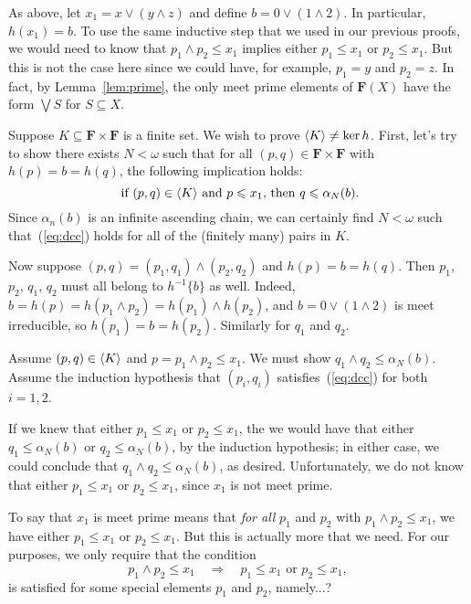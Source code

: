 As above, let $x_1 = x \vee (y \wedge z)$ and define $b = 0\vee (1 \wedge 2)$.  
In particular, $h(x_1) = b$. 
To use the same inductive step that we used in our previous proofs, we would need to know 
that $p_1 \wedge p_2 \leq x_1$ implies either $p_1 \leq x_1$ or $p_2 \leq x_1$.  But this 
is not the case here since we could have, for example, $p_1 = y$ and $p_2 = z$. In fact, 
by Lemma~\ref{lem:prime}, the only meet prime elements of $\mathbf F(X)$ have the 
form $\bigvee S$ for $S\subseteq X$.  

Suppose $K \subseteq \mathbf F \times \mathbf F$ is a finite set. 
We wish to prove $\langle K\rangle \neq \ker h$.
First, let's try to show there exists $N < \omega$ such that 
for all $(p, q)\in \mathbf F \times \mathbf F$ with $h(p) = b = h(q)$, 
the following implication holds:
\begin{equation}\label{eq:dcc}
\text{ if $(p, q) \in \langle K\rangle$ and $p \leqslant x_1$, then $q \leqslant \alpha_N(b)$.} 
\end{equation}
Since $\alpha_n(b)$ is an infinite ascending chain, 
we can certainly find $N < \omega$ such that~(\ref{eq:dcc}) holds for all 
of the (finitely many) pairs in $K$.

Now suppose $(p, q) = (p_1, q_1) \wedge (p_2, q_2)$ and $h(p) = b = h(q)$. 
Then $p_1$, $p_2$, $q_1$, $q_2$ must all belong to $h^{-1}\{b\}$ as well. 
Indeed, $b = h(p) = h(p_1 \wedge p_2)= h(p_1) \wedge h(p_2)$, and
$b = 0\vee (1 \wedge 2)$ is meet irreducible, so 
$h(p_1) = b = h(p_2)$. Similarly for $q_1$ and $q_2$.

Assume $(p, q) \in \langle K\rangle$ and $p = p_1\wedge p_2 \leq x_1$.  
We must show $q_1 \wedge q_2 \leq \alpha_N(b)$.
Assume the induction hypothesis that $(p_i, q_i)$ satisfies~(\ref{eq:dcc}) for both $i = 1, 2$.

If we knew that either $p_1\leq x_1$ or $p_2\leq x_1$, the we would have that either 
$q_1 \leq \alpha_N(b)$ or 
$q_2 \leq \alpha_N(b)$, by the induction hypothesis; in either case, we could 
conclude that $q_1 \wedge q_2 \leq \alpha_N(b)$, as desired. Unfortunately, we do 
not know that either $p_1\leq x_1$ or $p_2\leq x_1$, since $x_1$ is not meet prime.

To say that $x_1$ is meet prime means that \emph{for all} $p_1$ and $p_2$ with 
$p_1 \wedge p_2 \leq x_1$, we have either $p_1 \leq x_1$ or $p_2 \leq x_1$.  
But this is actually more that we need.
For our purposes, we only require that the condition
\begin{equation}
p_1 \wedge p_2 \leq x_1 \quad \Longrightarrow \quad p_1 \leq x_1 \text{ or } p_2 \leq x_1,
\end{equation}
is satisfied for some special elements $p_1$ and $p_2$, namely...?

